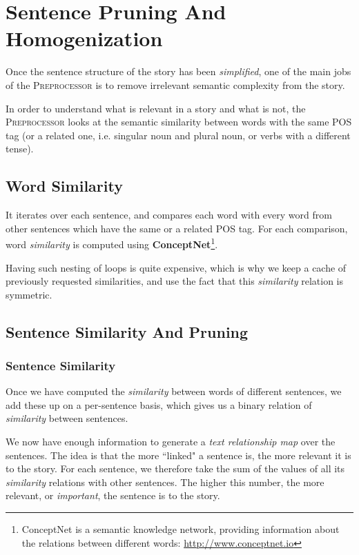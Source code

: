 \section{Sentence Pruning And Homogenization}
\label{sec:pruning_homogenization}

Once the sentence structure of the story has been \textit{simplified}, one of the main jobs of the \textsc{Preprocessor} is to remove irrelevant semantic complexity from the story.

In order to understand what is relevant in a story and what is not, the \textsc{Preprocessor} looks at the semantic similarity between words with the same POS tag (or a related one, i.e. singular noun and plural noun, or verbs with a different tense).

\subsection{Word Similarity}

It iterates over each sentence, and compares each word with every word from other sentences which have the same or a related POS tag. For each comparison, word \textit{similarity} is computed using \textbf{ConceptNet}\footnote{ConceptNet is a semantic knowledge network, providing information about the relations between different words: \url{http://www.conceptnet.io}}.

Having such nesting of loops is quite expensive, which is why we keep a cache of previously requested similarities, and use the fact that this \textit{similarity} relation is symmetric.

\subsection{Sentence Similarity And Pruning}

\subsubsection{Sentence Similarity}

Once we have computed the \textit{similarity} between words of different sentences, we add these up on a per-sentence basis, which gives us a binary relation of \textit{similarity} between sentences.

We now have enough information to generate a \textit{text relationship map} over the sentences. The idea is that the more ``linked" a sentence is, the more relevant it is to the story. For each sentence, we therefore take the sum of the values of all its \textit{similarity} relations with other sentences. The higher this number, the more relevant, or \textit{important}, the sentence is to the story.

